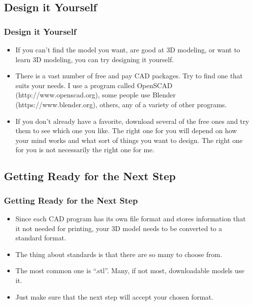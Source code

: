 \documentclass[english,10pt]{beamer}
\begin{document}
\subsection{Design it Yourself}
\begin{frame}
  \frametitle{Design it Yourself}
  \begin{itemize}
    \item If you can't find the model you want, are good at 3D modeling, or want to learn 3D modeling, you can try designing it yourself.
  
    \item There is a vast number of free and pay CAD packages.  Try to find one that suits your needs.  I use a program called OpenSCAD (http://www.openscad.org), some people use Blender (https://www.blender.org), others, any of a variety of other programs.
  
    \item If you don't already have a favorite, download several of the free ones and try them to see which one you like.  The right one for you will depend on how your mind works and what sort of things you want to design.  The right one for you is not necessarily the right one for me.
  \end{itemize}
\end{frame}

\subsection{Getting Ready for the Next Step}
\begin{frame}
  \frametitle{Getting Ready for the Next Step}
  \begin{itemize}
    \item Since each CAD program has its own file format and stores information that it not needed for printing, your 3D model needs to be converted to a standard format.
    \item The thing about standards is that there are so many to choose from.
    \item The most common one is  ``.stl''.  Many, if not most, downloadable models use it.
    \item Just make sure that the next step will accept your chosen format.
  \end{itemize}
\end{frame}
\end{document}
